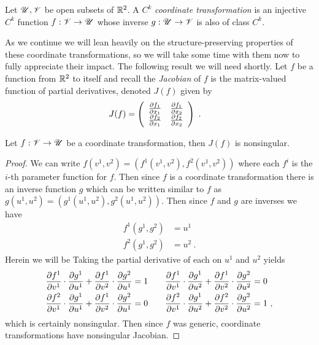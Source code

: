\begin{defn} %
  Let $\mathscr{U}, \mathscr{V}$ be open subsets of $\mathbb{R}^2$. A $C^k$ \emph{coordinate transformation} is an injective $C^k$ function $f: \mathscr{V} \to \mathscr{U}$ whose inverse $g:\mathscr{U} \to \mathscr{V}$ is also of class $C^k$. 
\end{defn}

As we continue we will lean heavily on the structure-preserving properties of these coordinate transformations, so we will take some time with them now to fully appreciate their impact. The following result we will need shortly. Let $f$ be a function from $\mathbb{R}^2$ to itself and recall the \emph{Jacobian} of $f$ is the matrix-valued function of partial derivatives, denoted $J(f)$ given by
\begingroup
  \renewcommand*{\arraystretch}{1.4}
  \begin{align*}
    J(f) &= \left(
    \begin{array}{cc}
      \frac{\partial f_1}{\partial x_1} & \frac{\partial f_1}{\partial x_2}\\
      \frac{\partial f_2}{\partial x_1} & \frac{\partial f_2}{\partial x_2}
    \end{array}
    \right) \ .
  \end{align*}
\endgroup

\begin{lem}
  Let $f:\mathscr{V} \to \mathscr{U}$ be a coordinate transformation, then $J(f)$ is nonsingular.
\end{lem}

\begin{proof}
  We can write $f(v^1, v^2) = (f^1(v^1, v^2), f^2(v^1, v^2))$ where each $f^i$ is the $i$-th parameter function for $f$. Then since $f$ is a coordinate transformation there is an inverse function $g$ which can be written similar to $f$ as $g(u^1, u^2) = (g^1(u^1, u^2), g^2(u^1, u^2))$. Then since $f$ and $g$ are inverses we have
  \begin{align*}
    f^1(g^1, g^2) &= u^1\\
    f^2(g^1, g^2) &= u^2 \ .
  \end{align*}
  Herein we will be Taking the partial derivative of each on $u^1$ and $u^2$ yields
  \newcommand{\fdg}[3]{\frac{\del f^{#1}}{\del v^{#2}} \cdot \frac{\del g^{#2}}{\del u^{#3}}}
  \begin{equation*}
    \begin{aligned}[c]
      \fdg{1}{1}{1} + \fdg{1}{2}{1} &= 1\\
      \fdg{2}{1}{1} + \fdg{1}{2}{1} &= 0
    \end{aligned}\qquad
    \begin{aligned}[c]
      \fdg{1}{1}{2} + \fdg{1}{2}{2} &= 0\\
      \fdg{2}{1}{2} + \fdg{2}{2}{2} &= 1 \ ,
    \end{aligned}
  \end{equation*}
  which is certainly nonsingular. Then since $f$ was generic, coordinate transformations have nonsingular Jacobian.
\end{proof}

